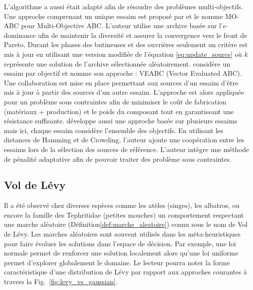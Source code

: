 L’algorithme a aussi était adapté afin de résoudre des problèmes multi-objectifs.
Une approche comprenant un unique essaim est proposé par \cite{Akbari201239}
et le nomme MO-ABC pour Multi-Objective ABC.
L’auteur utilise une archive basée sur l’$\epsilon$-dominance afin de maintenir
la diversité et assurer la convergence vers le front de Pareto. Durant les phases
des butineuses et des ouvrières seulement un critère est mis à jour en utilisant
une version modifiée de l’équation \eqref{eq:update_source} où $k$ représente une
solution de l’archive sélectionnée aléatoirement.
\cite{Omkar2011489} considère un essaim par objectif et nomme son approche : VEABC  (Vector Evaluated ABC).
Une collaboration est mise en place permettant aux sources d’un essaim d’être mis
à jour à partir des sources d’un autre essaim. L’approche est alors appliquée pour un
problème sous contraintes afin de minimiser le coût de fabrication (matériaux + production)
et le poids du composant tout en garantissant une résistance suffisante.
\cite{Zhang20121} développe aussi une approche basée sur plusieurs essaims mais ici,
chaque essaim considère l’ensemble des objectifs. En utilisant les distances de Hamming
et de Crowding, l’auteur ajoute une coopération entre les essaims lors de la sélection
des sources de référence. L’auteur intègre une méthode de pénalité adaptative \parencite{Woldesenbet20073077}
afin de pouvoir traiter des problème sous contraintes.



\subsection{Vol de Lévy} %
\label{sub:vol_de_levy}
Il a été observé chez diverses espèces comme les atèles (singes), les albatros, ou encore la famille des
Tephritidae (petites mouches) un comportement respectant une marche aléatoire (Définition\ref{def:marche_aleatoire}) connu
sous le nom de Vol de Lévy.
Les marches aléatoires sont souvent utilisés dans les méta-heuristiques pour faire
évoluer les solutions dans l’espace de décision. Par exemple, une loi normale permet
de renforcer une solution localement alors qu’une loi uniforme permet d’explorer
globalement le domaine. Le lecteur pourra noter la forme caractéristique d’une distribution
de Lévy par rapport aux approches courantes à travers la Fig.~\ref{fig:levy_vs_gaussian}.

